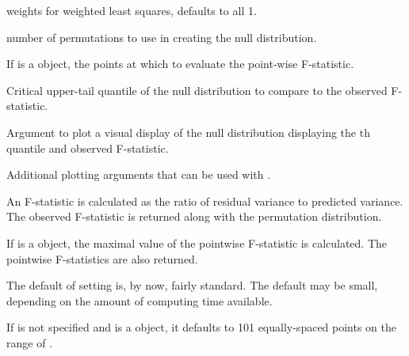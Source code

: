 \documentclass{article}
\begin{document}
\begin{Arguments}
\begin{ldescription}
\item[\code{wt}] weights for weighted least squares, defaults to all 1.

\item[\code{nperm}] number of permutations to use in creating the null distribution.

\item[\code{argvals}] If  is a  object, the points at which to evaluate
the point-wise F-statistic.

\item[\code{q}] Critical upper-tail quantile of the null distribution to compare to the observed F-statistic.

\item[\code{plotres}] Argument to plot a visual display of the null distribution displaying the
th quantile and observed F-statistic.

\item[\code{...}] Additional plotting arguments that can be used with .

\end{ldescription}
\end{Arguments}
\begin{Details}\relax
An F-statistic is calculated as the ratio of residual variance to predicted
variance. The observed F-statistic is returned along with the permutation
distribution.

If  is a  object, the maximal value of the pointwise
F-statistic is calculated. The pointwise F-statistics are also returned.

The default of setting  is, by now, fairly standard. The default
 may be small, depending on the amount of computing time available.

If  is not specified and  is a  object,
it defaults to 101 equally-spaced points on the range of .
\end{Details}
\end{document}

